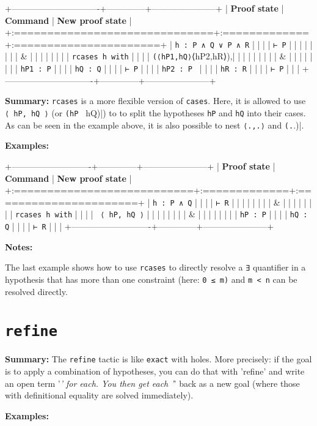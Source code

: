 \documentclass{memoir}
\begin{document}
+-------------------------------+--------------+-----------------------+
| \textbf{Proof state} | \textbf{Command} | \textbf{New proof state} |
+:==============================+:=============+:======================+
| \Verb|h : P ∧ Q ∨ P ∧ R| | | |
| \Verb|⊢ P| | | |
| | | |
| & | | |
| | | |
| \Verb|rcases h with| | | |
| \Verb|(⟨hP1,hQ⟩|⟨hP2,hR⟩),| | | |
| | | |
| & | | |
| | | |
| \Verb|hP1 : P| | | |
| \Verb|hQ : Q| | | |
| \Verb|⊢ P| | | |
| \Verb|hP2 : P | | | |
| \Verb|hR : R| | | |
| \Verb|⊢ P| | | |
+-------------------------------+--------------+-----------------------+

\textbf{Summary:} \Verb|rcases| is a more flexible version of \Verb|cases|. Here, it is allowed to use \Verb|⟨ hP, hQ ⟩| (or \Verb|(hP | hQ)|) to to split the hypotheses \Verb|hP| and \Verb|hQ| into their cases.  As can be seen in the example above, it is also possible to nest \Verb|⟨.,.⟩| and \Verb|(.|.)|.

\textbf{Examples:}

+----------------------------+--------------+-----------------------+
| \textbf{Proof state} | \textbf{Command} | \textbf{New proof state} |
+:===========================+:=============+:======================+
| \Verb|h : P ∧ Q| | | |
| \Verb|⊢ R| | | |
| | | |
| & | | |
| | | |
| \Verb|rcases h with| | | |
| \Verb| ⟨ hP, hQ ⟩| | | |
| | | |
| & | | |
| | | |
| \Verb|hP : P| | | |
| \Verb|hQ : Q| | | |
| \Verb|⊢ R| | | |
+----------------------------+--------------+-----------------------+

\textbf{Notes:}

The last example shows how to use \Verb|rcases| to directly resolve a \Verb|∃| quantifier in a hypothesis that has more than one constraint (here: \Verb|0 ≤ m)| and \Verb|m < n| can be resolved directly.




\section{\Verb|refine|}

\textbf{Summary:} The \Verb|refine| tactic is like \Verb|exact| with holes. More precisely: if the goal is to apply a combination of hypotheses, you can do that with 'refine' and write an open term '\emph{' for each. You then get each '}' back as a new goal (where those with definitional equality are solved immediately).

\textbf{Examples:}
\end{document}
